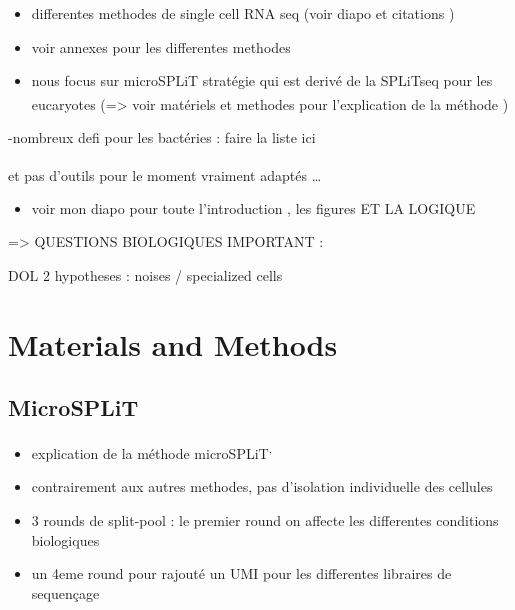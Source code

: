 \documentclass[
  11pt,
  a4paper,
]{report}
\providecommand{\tightlist}{%
  \setlength{\itemsep}{0pt}\setlength{\parskip}{0pt}}\usepackage{longtable,booktabs,array}
\begin{document}
\begin{itemize}
\tightlist
\item
  differentes methodes de single cell RNA seq (voir diapo et citations )
\item
  voir annexes pour les differentes methodes
\item
  nous focus sur microSPLiT stratégie qui est derivé de la SPLiTseq pour
  les eucaryotes (=\textgreater{} voir matériels et methodes pour
  l'explication de la méthode
  )\textsuperscript{}
\end{itemize}

-nombreux defi pour les bactéries : faire la liste ici

et pas d'outils pour le moment vraiment adaptés
\ldots{}\textsuperscript{}

\begin{itemize}
\tightlist
\item
  voir mon diapo pour toute l'introduction , les figures ET LA LOGIQUE
\end{itemize}

=\textgreater{} QUESTIONS BIOLOGIQUES IMPORTANT :

DOL 2 hypotheses : noises / specialized cells


\chapter{Materials and Methods}\label{sec-materials-and-methods}

\section{MicroSPLiT}\label{microsplit}

\begin{itemize}
\item
  explication de la méthode
  microSPLiT\textsuperscript{,}
\item
  contrairement aux autres methodes, pas d'isolation individuelle des
  cellules
\item
  3 rounds de split-pool : le premier round on affecte les differentes
  conditions biologiques
\item
  un 4eme round pour rajouté un UMI pour les differentes libraires de
  sequençage
\end{itemize}
\end{document}
